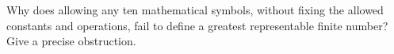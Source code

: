 Why does allowing any ten mathematical symbols, without fixing the allowed constants and operations, fail to define a greatest representable finite number? Give a precise obstruction.
